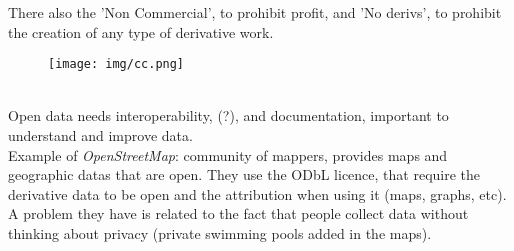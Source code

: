 \documentclass[a4paper, 10pt, titlepage]{article}
\begin{document}
There also the 'Non Commercial', to prohibit profit, and 'No derivs', to prohibit the creation of any type of derivative work.
\begin{figure}[h]
\centering
\texttt{[image: img/cc.png]}
\end{figure} \\
Open data needs interoperability, (?), and documentation, important to understand and improve data. \medskip \\
Example of \textit{OpenStreetMap}: community of mappers, provides maps and geographic datas that are open. They use the ODbL licence, that require the derivative data to be open and the attribution when using it (maps, graphs, etc). A problem they have is related to the fact that people collect data without thinking about privacy (private swimming pools added in the maps).
\end{document}
